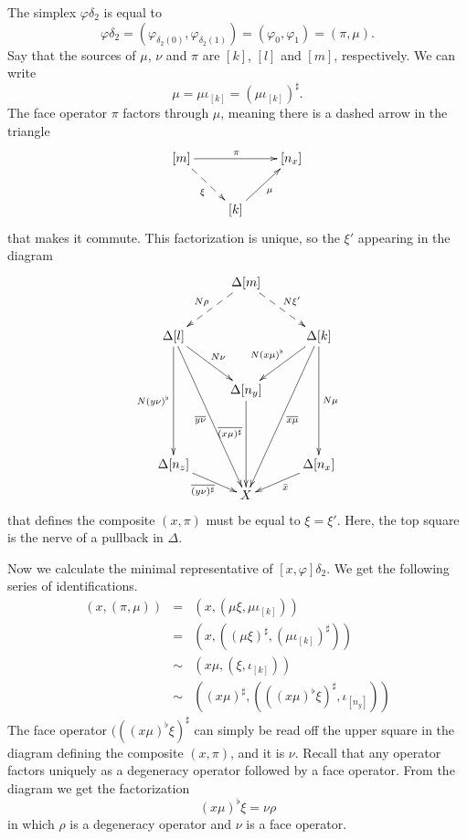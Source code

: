 The simplex $\varphi \delta _2$ is equal to
\[\varphi \delta _2=(\varphi _{\delta _2(0)},\varphi _{\delta _2(1)})=(\varphi _0,\varphi _1)=(\pi ,\mu ).\]
Say that the sources of $\mu$, $\nu$ and $\pi$ are $[k]$, $[l]$ and $[m]$, respectively. We can write
\[\mu =\mu \iota _{[k]}=(\mu \iota _{[k]})^\sharp .\]
The face operator $\pi$ factors through $\mu$, meaning there is a dashed arrow in the triangle
\begin{displaymath}
 \xymatrix{
 [m] \ar@{-->}[dr]_\xi \ar[rr]^\pi && [n_x] \\
 & [k] \ar[ur]_\mu
 }
\end{displaymath}
that makes it commute. This factorization is unique, so the $\xi '$ appearing in the diagram
\begin{displaymath}
 \xymatrix@=1em{
 && \Delta [m] \ar@{-->}[lldd]_{N\rho } \ar@{-->}[ddrr]^{N\xi '} \\
 \\
 \Delta [l] \ar[ddrr]^{N\nu } \ar[ddddd]_{N(y\nu )^\flat } \ar[ddddddrr]_{\overline{y\nu } } &&&& \Delta [k] \ar[lldd]_{N(x\mu )^\flat } \ar[ddddd]^{N\mu } \ar[lldddddd]^{\overline{x\mu } } \\
 \\
 && \Delta [n_y] \ar[dddd]_(.4){\overline{(x\mu )^\sharp } } \\
 &&&& \\
 \\
 \Delta [n_z] \ar[drr]_{\overline{(y\nu )^\sharp } } &&&& \Delta [n_x] \ar[lld]^{\bar{x} } \\
 && X
 }
\end{displaymath}
that defines the composite $(x,\pi )$ must be equal to $\xi =\xi '$. Here, the top square is the nerve of a pullback in $\Delta$.

Now we calculate the minimal representative of $[x,\varphi ]\delta _2$. We get the following series of identifications.
\begin{displaymath}
 \begin{array}{rcl}
 (x,(\pi ,\mu )) & = & (x,(\mu \xi ,\mu \iota _{[k]})) \\
  & = & (x,((\mu \xi )^\sharp ,(\mu \iota _{[k]})^\sharp )) \\
  & \sim & (x\mu ,(\xi ,\iota _{[k]})) \\
  & \sim & ((x\mu )^\sharp ,(((x\mu )^\flat \xi )^\sharp ,\iota _{[n_y]}))
 \end{array}
\end{displaymath}
The face operator $(((x\mu )^\flat \xi )^\sharp$ can simply be read off the upper square in the diagram defining the
composite $(x,\pi )$, and it is $\nu$. Recall that any operator factors uniquely as a degeneracy operator followed by
a face operator. From the diagram we get the factorization
\[(x\mu )^\flat \xi =\nu \rho\]
in which $\rho$ is a degeneracy operator and $\nu$ is a face operator.

